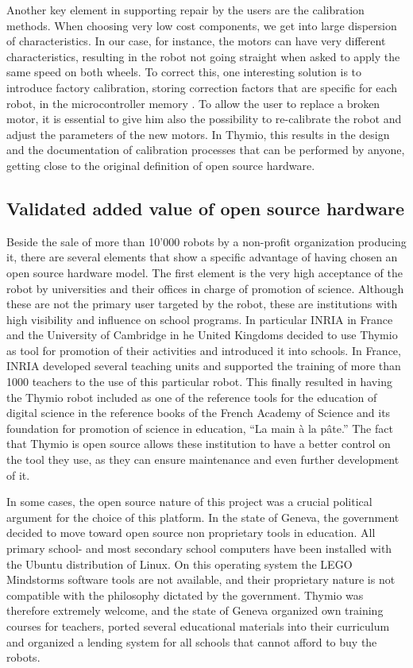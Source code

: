 \documentclass[letterpaper, 10 pt, conference]{ieeeconf}  %
\begin{document}
Another key element in supporting repair by the users are the calibration methods. 
When choosing very low cost components, we get into large dispersion of characteristics. 
In our case, for instance, the motors can have very different characteristics, resulting in the robot not going straight when asked to apply the same speed on both wheels. 
To correct this, one interesting solution is to introduce factory calibration, storing correction factors that are specific for each robot, in the microcontroller memory . 
To allow the user to replace a broken motor, it is essential to give him also the possibility to re-calibrate the robot and adjust the parameters of the new motors.
In Thymio, this results in the design and the documentation of calibration processes that can be performed by anyone, getting close to the original definition of open source hardware.

\subsection{Validated added value of open source hardware}

Beside the sale of more than 10'000 robots by a non-profit organization producing it, there are several elements that show a specific advantage of having chosen an open source hardware model.
The first element is the very high acceptance of the robot by universities and their offices in charge of promotion of science.
Although these are not the primary user targeted by the robot, these are institutions with high visibility and influence on school programs. 
In particular INRIA in France and the University of Cambridge in he United Kingdoms decided to use Thymio as tool for promotion of their activities and introduced it into schools.
In France, INRIA developed several teaching units and supported the training of more than 1000 teachers to the use of this particular robot. 
This finally resulted in having the Thymio robot included as one of the reference tools for the education of digital science in the reference books of the French Academy of Science and its foundation for promotion of science in education, ``La main \`a la p\^ate.''
The fact that Thymio is open source allows these institution to have a better control on the tool they use, as they can ensure maintenance and even further development of it. 

In some cases, the open source nature of this project was a crucial political argument for the choice of this platform.
In the state of Geneva, the government decided to move toward open source non proprietary tools in education.
All primary school- and most secondary school computers have been installed with the Ubuntu distribution of Linux. 
On this operating system the LEGO Mindstorms software tools are not available, and their proprietary nature is not compatible with the philosophy dictated by the government. 
Thymio was therefore extremely welcome, and the state of Geneva organized own training courses for teachers, ported several educational materials into their curriculum and organized a lending system for all schools that cannot afford to buy the robots.
\end{document}

